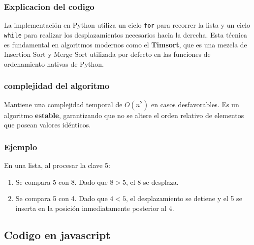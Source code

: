 \documentclass[
  spanish,
  letterpaper,
  DIV=11,
  numbers=noendperiod]{scrreprt}
\providecommand{\tightlist}{%
  \setlength{\itemsep}{0pt}\setlength{\parskip}{0pt}}
\begin{document}
\subsubsection{\texorpdfstring{\textbf{Explicacion del
codigo}}{Explicacion del codigo}}\label{explicacion-del-codigo-1}

La implementación en Python utiliza un ciclo \texttt{for} para recorrer
la lista y un ciclo \texttt{while} para realizar los desplazamientos
necesarios hacia la derecha. Esta técnica es fundamental en algoritmos
modernos como el \textbf{Timsort}, que es una mezcla de Insertion Sort y
Merge Sort utilizada por defecto en las funciones de ordenamiento
nativas de Python.

\subsubsection{\texorpdfstring{\textbf{complejidad del
algoritmo}}{complejidad del algoritmo}}\label{complejidad-del-algoritmo-1}

Mantiene una complejidad temporal de \textbf{\(O(n^2)\)} en casos
desfavorables. Es un algoritmo \textbf{estable}, garantizando que no se
altere el orden relativo de elementos que posean valores idénticos.

\subsubsection{\texorpdfstring{\textbf{Ejemplo}}{Ejemplo}}\label{ejemplo-2}

En una lista, al procesar la clave 5:

\begin{enumerate}
\def\labelenumi{\arabic{enumi}.}
\tightlist
\item
  Se compara 5 con 8. Dado que \(8 > 5\), el 8 se desplaza.
\item
  Se compara 5 con 4. Dado que \(4 < 5\), el desplazamiento se detiene y
  el 5 se inserta en la posición inmediatamente posterior al 4.
\end{enumerate}

\subsection{\texorpdfstring{\textbf{Codigo en
javascript}}{Codigo en javascript}}\label{codigo-en-javascript}
\end{document}
